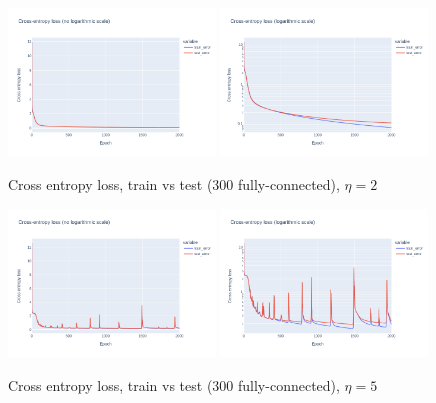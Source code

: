 \documentclass[12pt]{article}
\begin{document}
\begin{figure}[ht]
  \centering
  \includegraphics[width=0.49\textwidth]{images/cross-entropy-comparison-1-300-lr2.png}
  \includegraphics[width=0.49\textwidth]{images/cross-entropy-comparison-1-300-lr2-log.png}
  \caption{Cross entropy loss, train vs test ($300$ fully-connected), $\eta = 2$}
  \label{fig: learning rate comparison 2}
\end{figure}
\begin{figure}[ht]
  \centering
  \includegraphics[width=0.49\textwidth]{images/cross-entropy-comparison-1-300-lr5.png}
  \includegraphics[width=0.49\textwidth]{images/cross-entropy-comparison-1-300-lr5-log.png}
  \caption{Cross entropy loss, train vs test ($300$ fully-connected), $\eta = 5$}
  \label{fig: learning rate comparison 5}
\end{figure}
\end{document}
